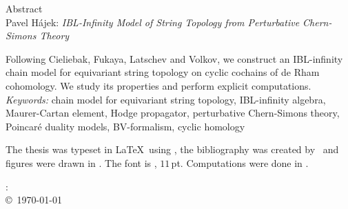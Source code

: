\documentclass[\MainFolder/Text.tex]{subfiles}
\begin{document}
\begin{center}
  {\LARGE Abstract}\\[0.5cm]
  Pavel H\'ajek: {\itshape IBL-Infinity Model of String Topology from Perturbative Chern-Simons Theory}
\end{center}

Following Cieliebak, Fukaya, Latschev and Volkov, we construct an IBL-infinity chain model for equivariant string topology on cyclic cochains of de Rham cohomology. We study its properties and perform explicit computations.\vspace{.8cm}\\
\noindent \emph{Keywords:} chain model for equivariant string topology, IBL-infinity algebra, Maurer-Cartan element, Hodge propagator, perturbative Chern-Simons theory, Poincar\'e duality models, BV-formalism, cyclic homology
\clearpage 
{\null\vfill
\begin{center} The thesis was typeset in \LaTeX\ using \Komaname, the bibliography was created by \Biblatexname\ and figures were drawn in \Tikzname. The font is \Libertinename, $11$\,pt. Computations were done in \Mathematicaname.
\end{center}
\makeatletter
\begin{center}
\@author: \textit{\@title} \\ 
\copyright\ \today \\
\end{center}
\makeatother
}
\end{document}
